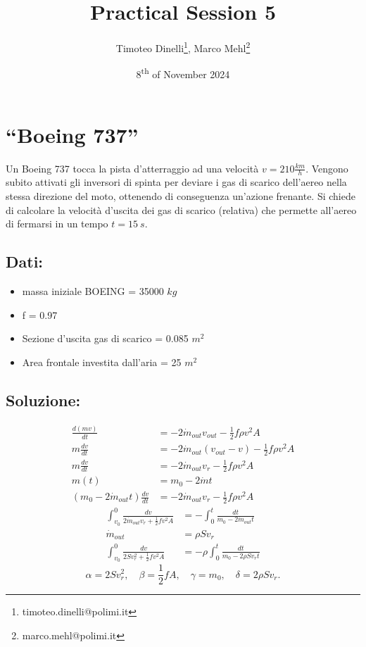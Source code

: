 \documentclass[oneside]{article}
\title{Practical Session 5}
\author{Timoteo Dinelli\footnote{timoteo.dinelli@polimi.it}, Marco Mehl\footnote{marco.mehl@polimi.it}}
\date{8\textsuperscript{th} of November 2024}
\begin{document}
\maketitle

\section{``Boeing 737''}
Un Boeing 737 tocca la pista d'atterraggio ad una velocità $v = 210 \frac{km}{h}$.
Vengono subito attivati gli inversori di spinta per deviare i gas di scarico dell'aereo
nella stessa direzione del moto, ottenendo di conseguenza un'azione frenante. Si chiede
di calcolare la velocità d'uscita dei gas di scarico (relativa) che permette all'aereo di
fermarsi in un tempo $t = 15 \: s$.

\subsection*{Dati:}
\begin{itemize}
   \item massa iniziale BOEING = 35000 $kg$
   \item f = 0.97
   \item Sezione d'uscita gas di scarico = 0.085 $m^{2}$
   \item Area frontale investita dall'aria = 25 $m^{2}$
\end{itemize}

\subsection*{Soluzione:}
\begin{align}
   \frac{d(mv)}{dt} &= -2\dot{m}_{out} v_{out} - \frac{1}{2} f \rho v^{2} A \\
   m\frac{dv}{dt} &= -2\dot{m}_{out} (v_{out} - v) - \frac{1}{2} f \rho v^{2} A \\
   m\frac{dv}{dt} &= -2 \dot{m}_{out} v_{r} - \frac{1}{2} f \rho v^{2} A \\
   m(t) &= m_{0} - 2\dot{m} t \\
   (m_{0} - 2\dot{m}_{out} t )\frac{dv}{dt} &= -2\dot{m}_{out} v_{r} - \frac{1}{2} f \rho
   v^{2} A
\end{align}
\begin{align}
   \int_{v_{0}}^{0}\frac{dv}{2\dot{m}_{out} v_{r} + \frac{1}{2} f v^{2} A} &=-
   \int_{0}^{t} \frac{dt}{m_{0} - 2\dot{m}_{out} t} \\
   \dot{m}_{out} &= \rho S v_{r} \\
   \int_{v_{0}}^{0}\frac{dv}{2 S v_{r}^{2} + \frac{1}{2} f v^{2} A} &=-\rho \int_{0}^{t}
   \frac{dt}{m_{0} - 2\rho S v_{r} t}
\end{align}
\begin{equation*}
   \alpha = 2 S v_{r}^{2}, \quad \beta = \frac{1}{2} f A, \quad \gamma = m_{0}, \quad
   \delta = 2 \rho S v_{r}.
\end{equation*}
\end{document}

